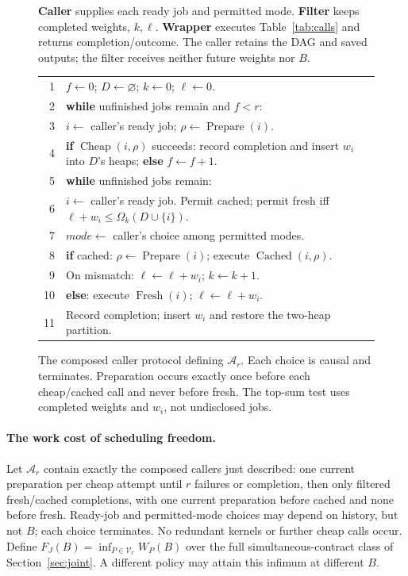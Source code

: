 \documentclass[acmsmall,screen,review,anonymous]{acmart}
\begin{document}
\begin{figure}[t]
\centering\small
\begin{minipage}{0.96\linewidth}
\textbf{Caller} supplies each ready job and permitted mode. \textbf{Filter} keeps completed weights, $k,\ell$. \textbf{Wrapper} executes Table~\ref{tab:calls} and returns completion/outcome. The caller retains the DAG and saved outputs; the filter receives neither future weights nor $B$.
\medskip

\begin{tabularx}{\linewidth}{@{}rX@{}}
1 & $f\gets0$; $D\gets\varnothing$; $k\gets0$; $\ell\gets0$.\\
2 & \textbf{while} unfinished jobs remain and $f<r$:\\
3 & \quad $i\gets$ caller's ready job; $\rho\gets\operatorname{Prepare}(i)$.\\
4 & \quad \textbf{if} $\operatorname{Cheap}(i,\rho)$ succeeds: record completion and insert $w_i$ into $D$'s heaps; \textbf{else} $f\gets f+1$.\\
5 & \textbf{while} unfinished jobs remain:\\
6 & \quad $i\gets$ caller's ready job. Permit cached; permit fresh iff $\ell+w_i\le\Omega_k(D\cup\{i\})$.\\
7 & \quad $\mathit{mode}\gets$ caller's choice among permitted modes.\\
8 & \quad \textbf{if} cached: $\rho\gets\operatorname{Prepare}(i)$; execute $\operatorname{Cached}(i,\rho)$.\\
9 & \qquad On mismatch: $\ell\gets\ell+w_i$; $k\gets k+1$.\\
10 & \quad \textbf{else}: execute $\operatorname{Fresh}(i)$; $\ell\gets\ell+w_i$.\\
11 & \quad Record completion; insert $w_i$ and restore the two-heap partition.\\
\end{tabularx}
\end{minipage}
\caption{The composed caller protocol defining $\mathcal A_r$. Each choice is causal and terminates. Preparation occurs exactly once before each cheap/cached call and never before fresh. The top-sum test uses completed weights and $w_i$, not undisclosed jobs.}
\label{fig:caller}
\end{figure}

\paragraph{The work cost of scheduling freedom.}
Let $\mathcal A_r$ contain exactly the composed callers just described: one current preparation per cheap attempt until $r$ failures or completion, then only filtered fresh/cached completions, with one current preparation before cached and none before fresh. Ready-job and permitted-mode choices may depend on history, but not $B$; each choice terminates. No redundant kernels or further cheap calls occur. Define $F_J(B)=\inf_{P\in\mathcal V_r}W_P(B)$ over the full simultaneous-contract class of Section~\ref{sec:joint}. A different policy may attain this infimum at different $B$.
\end{document}
